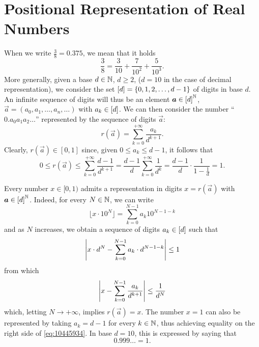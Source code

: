 \section{Positional Representation of Real Numbers}
\label{sec:decimali}
When we write $\frac{3}{8} = 0.375$, we mean that it holds 
\[
\frac 3 8 = \frac{3}{10} + \frac{7}{10^2} + \frac{5}{10^3}.  
\]
More generally, given a base $d\in {\mathbb N}$, $d\ge 2$, ($d=10$ in 
the case of decimal representation), we consider the set ${\left[ d \right]} =
{\left\{ 0,1,2,\dots, d-1 \right\}}$
of digits in base $d$.
An infinite sequence of digits will thus be an element 
$\boldsymbol a \in {\left[ d \right]}^{\mathbb N}$, $\vec a = (a_0,a_1,\dots, a_n, \dots)$
with $a_k\in {\left[ d \right]}$.
We can then consider the number ``$0.a_0 a_1 a_2 \ldots$'' represented 
by the sequence of digits $\vec a$:
\[
  r(\vec a) = \sum_{k=0}^{+\infty} \frac{a_k}{d^{k+1}}.
\]
Clearly, $r(\vec a)\in [0,1]$ since, given $0\le a_k\le d-1$, 
it follows that
\begin{equation}\label{eq:10445934}
 0 \le r(\vec a) \le \sum_{k=0}^{+\infty} \frac{d-1}{d^{k+1}}
  = \frac{d-1}{d}\sum_{k=0}^{+\infty}\frac 1 {d^k}
  = \frac{d-1}{d}\cdot \frac{1}{1-\frac 1 d} = 1.
\end{equation}

Every number $x\in [0,1)$ admits a representation in digits $x=r(\vec a)$ 
with $\boldsymbol a \in {\left[ d \right]}^{\mathbb N}$. 
Indeed, for every $N\in {\mathbb N}$, we can write 
\[
  \lfloor x\cdot 10^N \rfloor= \sum_{k=0}^{N-1} a_k 10^{N-1-k}
\]
and as $N$ increases, we obtain a sequence of digits $a_k\in {\left[ d \right]}$ 
such that 
\[
  {\left|x \cdot d^N - \sum_{k=0}^{N-1} a_k \cdot d^{N-1-k}\right|} \le 1
\]
from which 
\[
  {\left|x - \sum_{k=0}^{N-1} \frac{a_k}{d^{k+1}}\right|} \le \frac{1}{d^{N}}
\]
which, letting $N\to +\infty$, implies $r(\vec a) = x$.
The number $x=1$ can also be represented by taking 
$a_k=d-1$ for every $k\in {\mathbb N}$, thus achieving equality 
on the right side of \eqref{eq:10445934}. 
In base $d=10$, this is expressed by saying that 
\[
 0.999\ldots = 1.  
\]

